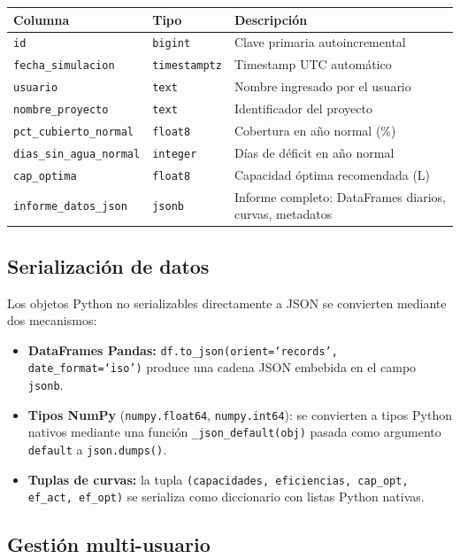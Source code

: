 \documentclass[12pt, a4paper]{article}
\begin{document}
\begin{center}
\begin{tabular}{llp{7cm}}
\toprule
\textbf{Columna} & \textbf{Tipo} & \textbf{Descripción} \\
\midrule
\texttt{id} & \texttt{bigint} & Clave primaria autoincremental \\
\texttt{fecha\_simulacion} & \texttt{timestamptz} & Timestamp UTC automático \\
\texttt{usuario} & \texttt{text} & Nombre ingresado por el usuario \\
\texttt{nombre\_proyecto} & \texttt{text} & Identificador del proyecto \\
\texttt{pct\_cubierto\_normal} & \texttt{float8} & Cobertura en año normal (\%) \\
\texttt{dias\_sin\_agua\_normal} & \texttt{integer} & Días de déficit en año normal \\
\texttt{cap\_optima} & \texttt{float8} & Capacidad óptima recomendada (L) \\
\texttt{informe\_datos\_json} & \texttt{jsonb} & Informe completo: DataFrames diarios, curvas, metadatos \\
\bottomrule
\end{tabular}
\end{center}

\subsection{Serialización de datos}

Los objetos Python no serializables directamente a JSON se convierten mediante dos mecanismos:

\begin{itemize}
    \item \textbf{DataFrames Pandas:} \texttt{df.to\_json(orient=`records', date\_format=`iso')} produce una cadena JSON embebida en el campo \texttt{jsonb}.
    \item \textbf{Tipos NumPy} (\texttt{numpy.float64}, \texttt{numpy.int64}): se convierten a tipos Python nativos mediante una función \texttt{\_json\_default(obj)} pasada como argumento \texttt{default} a \texttt{json.dumps()}.
    \item \textbf{Tuplas de curvas:} la tupla \texttt{(capacidades, eficiencias, cap\_opt, ef\_act, ef\_opt)} se serializa como diccionario con listas Python nativas.
\end{itemize}

\subsection{Gestión multi-usuario}
\end{document}
